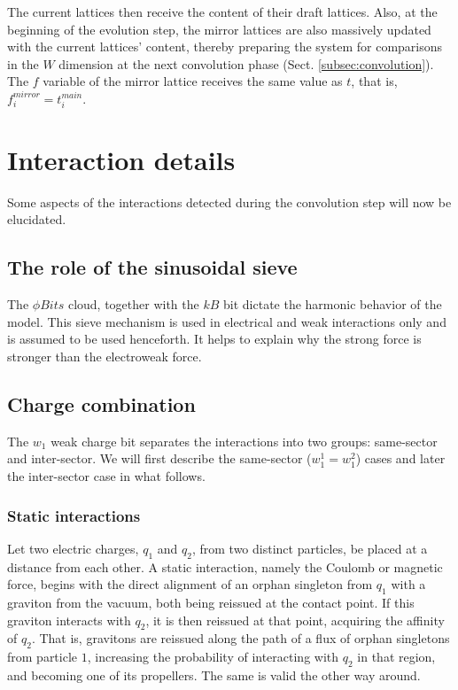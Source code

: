 \documentclass[12pt]{article}
\begin{document}
The current lattices then receive the content of their draft lattices. Also, at the beginning of the evolution step, the mirror lattices are also massively updated with the current lattices' content, thereby preparing the system for comparisons in the $W  $ dimension at the next convolution phase (Sect. \ref{subsec:convolution}). The $f$ variable of the mirror lattice receives the same value as $t$, that is, $f_i^{mirror}=t_i^{main}$.


\section{Interaction details\label{sec:Interactions}}

Some aspects of the interactions detected during the convolution step will now be elucidated.

\subsection{The role of the sinusoidal sieve}

The $\phi Bits$ cloud, together with the $kB$ bit dictate the harmonic behavior of the model. This sieve mechanism is used in electrical and weak interactions only and is assumed to be used henceforth. It helps to explain why the strong force is stronger than the electroweak force.

\subsection{Charge combination}

The $w_{1}$ weak charge bit separates the interactions into two groups:
same-sector and inter-sector. We will first describe the same-sector ($w_{1}^{1}=w_{1}^{2}$) cases and later the inter-sector case in what follows.

\subsubsection{Static interactions}

Let two electric charges, $q_1$ and $q_2$, from two distinct particles, be placed at a distance from each other. A static interaction, namely the Coulomb or magnetic force, begins with the direct alignment of an orphan singleton from $q_1$ with a graviton from the vacuum, both being reissued at the contact point. If this graviton interacts with $q_2$, it is then reissued at that point, acquiring the affinity of $q_2$. That is, gravitons are reissued along the path of a flux of orphan singletons from particle $1$, increasing the probability of interacting with $q_2$ in that region, and becoming one of its propellers. The same is valid the other way around.
\end{document}
